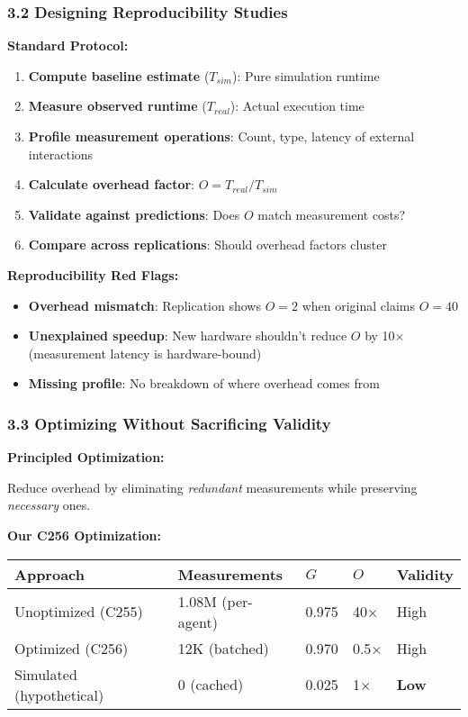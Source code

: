 \documentclass[
]{article}
\newcounter{none} %
\providecommand{\tightlist}{%
  \setlength{\itemsep}{0pt}\setlength{\parskip}{0pt}}
\begin{document}
\subsubsection{3.2 Designing Reproducibility
Studies}\label{designing-reproducibility-studies}

\textbf{Standard Protocol:}

\begin{enumerate}
\def\labelenumi{\arabic{enumi}.}
\tightlist
\item
  \textbf{Compute baseline estimate} (\(T_{sim}\)): Pure simulation
  runtime
\item
  \textbf{Measure observed runtime} (\(T_{real}\)): Actual execution
  time
\item
  \textbf{Profile measurement operations}: Count, type, latency of
  external interactions
\item
  \textbf{Calculate overhead factor}: \(O = T_{real} / T_{sim}\)
\item
  \textbf{Validate against predictions}: Does \(O\) match measurement
  costs?
\item
  \textbf{Compare across replications}: Should overhead factors cluster
\end{enumerate}

\textbf{Reproducibility Red Flags:}

\begin{itemize}
\tightlist
\item
  \textbf{Overhead mismatch}: Replication shows \(O = 2\) when original
  claims \(O = 40\)
\item
  \textbf{Unexplained speedup}: New hardware shouldn't reduce \(O\) by
  10× (measurement latency is hardware-bound)
\item
  \textbf{Missing profile}: No breakdown of where overhead comes from
\end{itemize}

\subsubsection{3.3 Optimizing Without Sacrificing
Validity}\label{optimizing-without-sacrificing-validity}

\textbf{Principled Optimization:}

Reduce overhead by eliminating \emph{redundant} measurements while
preserving \emph{necessary} ones.

\textbf{Our C256 Optimization:}

{\def\LTcaptype{none} %
\begin{longtable}[]{@{}lllll@{}}
\toprule\noalign{}
Approach & Measurements & \(G\) & \(O\) & Validity \\
\midrule\noalign{}
\endhead
\bottomrule\noalign{}
\endlastfoot
Unoptimized (C255) & 1.08M (per-agent) & 0.975 & 40× & High \\
Optimized (C256) & 12K (batched) & 0.970 & 0.5× & High \\
Simulated (hypothetical) & 0 (cached) & 0.025 & 1× & \textbf{Low} \\
\end{longtable}
}
\end{document}
